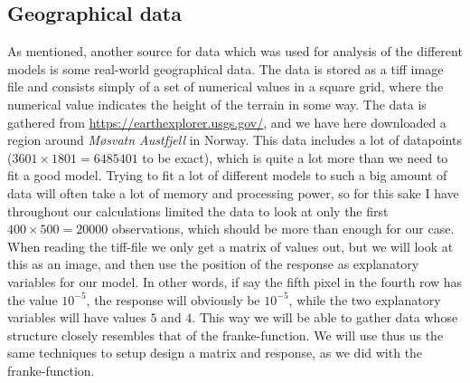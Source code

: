 \documentclass{article}
\begin{document}
\subsection{Geographical data}
As mentioned, another source for data which was used for analysis of the
different models is some real-world geographical data. The data is stored as a
tiff image file and consists simply of a set of numerical values in a square
grid, where the numerical value indicates the height of the terrain in some way.
The data is gathered from \url{https://earthexplorer.usgs.gov/}, and we have
here downloaded a region around \textit{Møsvatn Austfjell} in Norway. This data
includes a lot of datapoints ($3601\times 1801 = 6485401$ to be exact), which is
quite a lot more than we need to fit a good model. Trying to fit a lot of
different models to such a big amount of data will often take a lot of memory
and processing power, so for this sake I have throughout our calculations
limited the data to look at only the first $400\times 500 = 20000$ observations,
which should be more than enough for our case. When reading the tiff-file we
only get a matrix of values out, but we will look at this as an image, and then
use the position of the response as explanatory variables for our model. In
other words, if say the fifth pixel in the fourth row has the value $10^{-5}$,
the response will obviously be $10^{-5}$, while the two explanatory variables
will have values $5$ and $4$.  This way we will be able to gather data whose
structure closely resembles that of the franke-function. We will use thus us the
same techniques to setup design a matrix and response, as we did with the
franke-function.
\end{document}
